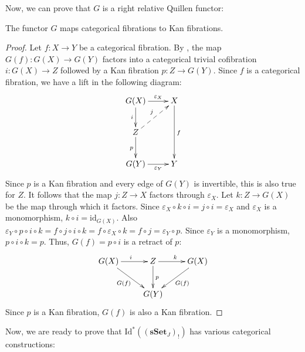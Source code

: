 \documentclass[reqno]{amsart}
\theoremstyle{definition}
\theoremstyle{remark}
\newcommand{\fs}[1]{\mathrm{#1}}
\newcommand{\cat}[1]{\mathbf{#1}}
\newcommand{\sSet}{\cat{sSet}}
\newcommand{\Id}{\fs{Id}}
\newcommand{\id}{\fs{id}}
\numberwithin{figure}{section}
\begin{document}
Now, we can prove that $G$ is a right relative Quillen functor:

\begin{lem}[G-fib]
The functor $G$ maps categorical fibrations to Kan fibrations.
\end{lem}
\begin{proof}
Let $f : X \to Y$ be a categorical fibration.
By , the map $G(f) : G(X) \to G(Y)$ factors into a categorical trivial cofibration $i : G(X) \to Z$ followed by a Kan fibration $p : Z \to G(Y)$.
Since $f$ is a categorical fibration, we have a lift in the following diagram:
\[ \xymatrix{ G(X) \ar[r]^-{\varepsilon_X} \ar[d]_i & X \ar[dd]^f   \\
              Z \ar[d]_p \ar@{-->}[ur]^j            &               \\
              G(Y) \ar[r]_-{\varepsilon_Y}          & Y
            } \]
Since $p$ is a Kan fibration and every edge of $G(Y)$ is invertible, this is also true for $Z$.
It follows that the map $j : Z \to X$ factors through $\varepsilon_X$.
Let $k : Z \to G(X)$ be the map through which it factors.
Since $\varepsilon_X \circ k \circ i = j \circ i = \varepsilon_X$ and $\varepsilon_X$ is a monomorphism, $k \circ i = \id_{G(X)}$.
Also $\varepsilon_Y \circ p \circ i \circ k = f \circ j \circ i \circ k = f \circ \varepsilon_X \circ k = f \circ j = \varepsilon_Y \circ p$.
Since $\varepsilon_Y$ is a monomorphism, $p \circ i \circ k = p$.
Thus, $G(f) = p \circ i$ is a retract of $p$:
\[ \xymatrix{ G(X) \ar[r]^i \ar[dr]_{G(f)}  & Z \ar[d]^p \ar[r]^k   & G(X) \ar[ld]^{G(f)} \\
                                            & G(Y)                  &
            } \]
Since $p$ is a Kan fibration, $G(f)$ is also a Kan fibration.
\end{proof}

Now, we are ready to prove that $\Id^*((\sSet_J)_!)$ has various categorical constructions:
\end{document}
